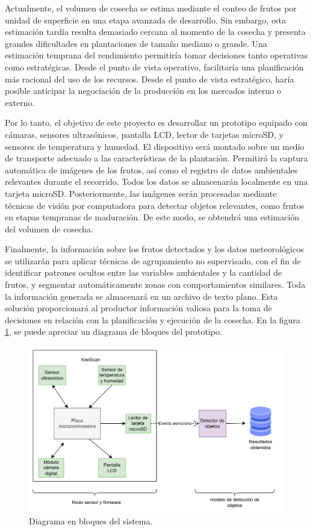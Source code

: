 \documentclass[
11pt, %
]{charter}
\begin{document}
Actualmente, el volumen de cosecha se estima mediante el conteo de frutos por unidad de superficie en una etapa avanzada de desarrollo. Sin embargo, esta estimación tardía resulta demasiado cercana al momento de la cosecha y presenta grandes dificultades en plantaciones de tamaño mediano o grande. Una estimación temprana del rendimiento permitiría tomar decisiones tanto operativas como estratégicas. Desde el punto de vista operativo, facilitaría una planificación más racional del uso de los recursos. Desde el punto de vista estratégico, haría posible anticipar la negociación de la producción en los mercados interno o externo.

Por lo tanto, el objetivo de este proyecto es desarrollar un prototipo equipado con cámaras, sensores ultrasónicos, pantalla LCD, lector de tarjetas microSD, y sensores de temperatura y humedad. El dispositivo será montado sobre un medio de transporte adecuado a las características de la plantación. Permitirá la captura automática de imágenes de los frutos, así como el registro de datos ambientales relevantes durante el recorrido. Todos los datos se almacenarán localmente en una tarjeta microSD. Posteriormente, las imágenes serán procesadas mediante técnicas de visión por computadora para detectar objetos relevantes, como frutos en etapas tempranas de maduración. De este modo, se obtendrá una estimación del volumen de cosecha.

Finalmente, la información sobre los frutos detectados y los datos meteorológicos se utilizarán para aplicar técnicas de agrupamiento no supervisado, con el fin de identificar patrones ocultos entre las variables ambientales y la cantidad de frutos, y segmentar automáticamente zonas con comportamientos similares. Toda la información generada se almacenará en un archivo de texto plano. Esta solución proporcionará al productor información valiosa para la toma de decisiones en relación con la planificación y ejecución de la cosecha. En la figura \ref{fig:diagBloques}, se puede apreciar un diagrama de bloques del prototipo.

\begin{figure}[htpb]
\centering 
\includegraphics[width=.90\textwidth]{./Figuras/KiwiScan.png}
\caption{Diagrama en bloques del sistema.}
\label{fig:diagBloques}
\end{figure}
\end{document}
